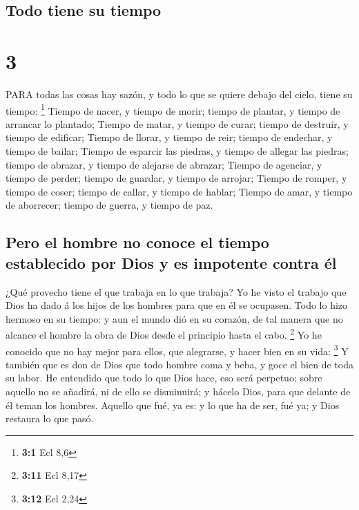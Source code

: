 \hypertarget{todo-tiene-su-tiempo}{%
\subsection{Todo tiene su tiempo}\label{todo-tiene-su-tiempo}}

\hypertarget{section-2}{%
\section{3}\label{section-2}}

 PARA todas las cosas hay sazón, y todo lo que se quiere
debajo del cielo, tiene su tiempo: \footnote{\textbf{3:1} Ecl 8,6}
 Tiempo de nacer, y tiempo de morir; tiempo de plantar, y
tiempo de arrancar lo plantado;  Tiempo de matar, y tiempo
de curar; tiempo de destruir, y tiempo de edificar;  Tiempo
de llorar, y tiempo de reir; tiempo de endechar, y tiempo de bailar;
 Tiempo de esparcir las piedras, y tiempo de allegar las
piedras; tiempo de abrazar, y tiempo de alejarse de abrazar;
 Tiempo de agenciar, y tiempo de perder; tiempo de guardar,
y tiempo de arrojar;  Tiempo de romper, y tiempo de coser;
tiempo de callar, y tiempo de hablar;  Tiempo de amar, y
tiempo de aborrecer; tiempo de guerra, y tiempo de paz.

\hypertarget{pero-el-hombre-no-conoce-el-tiempo-establecido-por-dios-y-es-impotente-contra-uxe9l}{%
\subsection{Pero el hombre no conoce el tiempo establecido por Dios y es
impotente contra
él}\label{pero-el-hombre-no-conoce-el-tiempo-establecido-por-dios-y-es-impotente-contra-uxe9l}}

 ¿Qué provecho tiene el que trabaja en lo que trabaja?
 Yo he visto el trabajo que Dios ha dado á los hijos de los
hombres para que en él se ocupasen.  Todo lo hizo hermoso
en su tiempo: y aun el mundo dió en su corazón, de tal manera que no
alcance el hombre la obra de Dios desde el principio hasta el cabo.
\footnote{\textbf{3:11} Ecl 8,17}  Yo he conocido que no
hay mejor para ellos, que alegrarse, y hacer bien en su vida:
\footnote{\textbf{3:12} Ecl 2,24}  Y también que es don de
Dios que todo hombre coma y beba, y goce el bien de toda su labor.
 He entendido que todo lo que Dios hace, eso será perpetuo:
sobre aquello no se añadirá, ni de ello se disminuirá; y hácelo Dios,
para que delante de él teman los hombres.  Aquello que fué,
ya es: y lo que ha de ser, fué ya; y Dios restaura lo que pasó.

